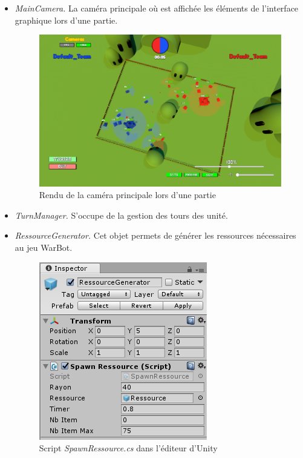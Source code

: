 \documentclass{report}
\begin{document}
\begin{itemize}
\item \textit{MainCamera.} La caméra principale où est affichée les éléments de l'interface graphique lors d'une partie.

\begin{figure}[!h]
\centering
\includegraphics[scale=0.5]{Screenshot001}
\caption{Rendu de la caméra principale lors d'une partie}
\end{figure}

\item \textit{TurnManager.} S'occupe de la gestion des tours des unité.


\item \textit{RessourceGenerator.} Cet objet permets de générer les ressources nécessaires au jeu WarBot.


\begin{figure}[!h]
\centering
\includegraphics[scale=0.85]{RessourceGeneratorImage}
\caption{Script \textit{SpawnRessource.cs} dans l'éditeur d'Unity}
\end{figure}


\end{itemize}
\end{document}

